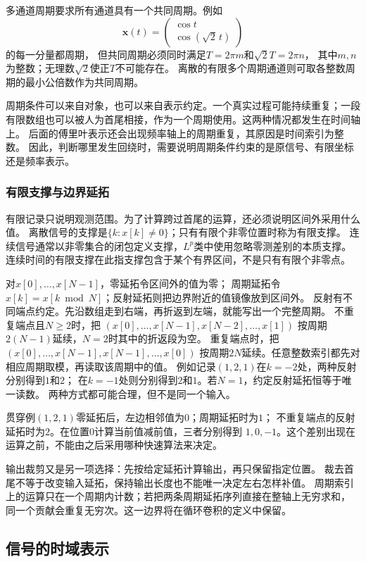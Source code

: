 多通道周期要求所有通道具有一个共同周期。例如
\[
  \bm x(t)=\begin{pmatrix}\cos t\\\cos(\sqrt2\,t)\end{pmatrix}
\]
的每一分量都周期，
但共同周期必须同时满足$T=2\pi m$和$\sqrt2 T=2\pi n$，
其中$m,n$为整数；无理数$\sqrt2$使正$T$不可能存在。
离散的有限多个周期通道则可取各整数周期的最小公倍数作为共同周期。

周期条件可以来自对象，也可以来自表示约定。一个真实过程可能持续重复；一段
有限数组也可以被人为首尾相接，作为一个周期使用。这两种情况都发生在时间轴上。
后面的傅里叶表示还会出现频率轴上的周期重复，其原因是时间索引为整数。
因此，判断哪里发生回绕时，需要说明周期条件约束的是原信号、有限坐标还是频率表示。

\subsubsection{有限支撑与边界延拓}

有限记录只说明观测范围。为了计算跨过首尾的运算，还必须说明区间外采用什么值。
离散信号的支撑是$\{k:x[k]\neq0\}$；只有有限个非零位置时称为有限支撑。
连续信号通常以非零集合的闭包定义支撑，$L^p$类中使用忽略零测差别的本质支撑。
连续时间的有限支撑在此指支撑包含于某个有界区间，不是只有有限个非零点。

对$x[0],\ldots,x[N-1]$，零延拓令区间外的值为零；
周期延拓令$x[k]=x[k\bmod N]$；反射延拓则把边界附近的值镜像放到区间外。
反射有不同端点约定。先沿数组走到右端，再折返到左端，就能写出一个完整周期。
不重复端点且$N\geq2$时，把
$(x[0],\ldots,x[N-1],x[N-2],\ldots,x[1])$
按周期$2(N-1)$延续，$N=2$时其中的折返段为空。
重复端点时，把$(x[0],\ldots,x[N-1],x[N-1],\ldots,x[0])$
按周期$2N$延续。任意整数索引都先对相应周期取模，再读取该周期中的值。
例如记录$(1,2,1)$在$k=-2$处，两种反射分别得到$1$和$2$；
在$k=-1$处则分别得到$2$和$1$。若$N=1$，约定反射延拓恒等于唯一读数。
两种方式都可能合理，但不是同一个输入。

贯穿例$(1,2,1)$零延拓后，左边相邻值为$0$；周期延拓时为$1$；
不重复端点的反射延拓时为$2$。在位置$0$计算当前值减前值，三者分别得到
$1,0,-1$。这个差别出现在运算之前，不能由之后采用哪种快速算法来决定。

输出裁剪又是另一项选择：先按给定延拓计算输出，再只保留指定位置。
裁去首尾不等于改变输入延拓，保持输出长度也不能唯一决定左右怎样补值。
周期索引上的运算只在一个周期内计数；若把两条周期延拓序列直接在整轴上无穷求和，
同一个贡献会重复无穷次。这一边界将在循环卷积的定义中保留。

\subsection{信号的时域表示}
\label{sec:signal-time-impulses}

